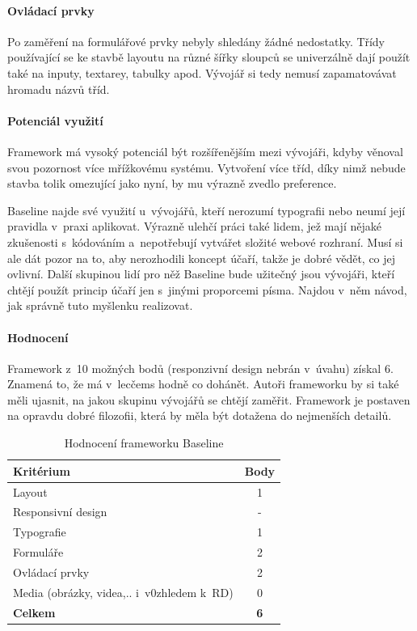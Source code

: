 \documentclass[thesis=B,czech]{FITthesis}[2012/06/26]
\begin{document}
\paragraph{Ovládací prvky}

Po zaměření na formulářové prvky nebyly shledány žádné nedostatky. Třídy používající se ke stavbě layoutu na různé šířky sloupců se univerzálně dají použít také na inputy, textarey, tabulky apod. Vývojář si tedy nemusí zapamatovávat hromadu názvů tříd.

\paragraph{Potenciál využití}

Framework má vysoký potenciál být rozšířenějším mezi vývojáři, kdyby věnoval svou pozornost více mřížkovému systému. Vytvoření více tříd, díky nimž nebude stavba tolik omezující jako nyní, by mu výrazně zvedlo preference.

Baseline najde své využití u~vývojářů, kteří nerozumí typografii nebo neumí její pravidla v~praxi aplikovat. Výrazně ulehčí práci také lidem, jež mají nějaké zkušenosti s~kódováním a~nepotřebují vytvářet složité webové rozhraní. Musí si ale dát pozor na to, aby nerozhodili koncept účaří, takže je dobré vědět, co jej ovlivní. Další skupinou lidí pro něž Baseline bude užitečný jsou vývojáři, kteří chtějí použít princip účaří jen s~jinými proporcemi písma. Najdou v~něm návod, jak správně tuto myšlenku realizovat.
\paragraph{Hodnocení}

Framework z~10 možných bodů (responzivní design nebrán v~úvahu) získal 6. Znamená to, že má v~lecčems hodně co dohánět. Autoři frameworku by si také měli ujasnit, na jakou skupinu vývojářů se chtějí zaměřit. Framework je postaven na opravdu dobré filozofii, která by měla být dotažena do nejmenších detailů. 

\begin{table}[h]\centering
 	\caption[Hodnocení Baseline]{Hodnocení frameworku Baseline}\label{tab:baseline}
 	\begin{tabular}{|l|c|}\hline
 	\textbf{Kritérium} & \textbf{Body}\tabularnewline
 	\hline\hline
		Layout & 1\tabularnewline
		\hline 
		 Responsivní design & -\tabularnewline
		\hline 
		Typografie & 1\tabularnewline
		\hline 
		Formuláře & 2\tabularnewline
		\hline 
		Ovládací prvky & 2\tabularnewline
		\hline 
		Media  (obrázky, videa,.. i~v0zhledem k~RD) & 0\tabularnewline
		\hline 
		\textbf{Celkem} & \textbf{6}\tabularnewline
		\hline 
 	\end{tabular}
\end{table} 
\end{document}
